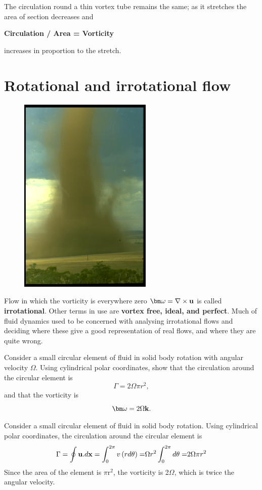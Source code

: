 \documentclass[10pt]{report}
\begin{document}
The circulation round a thin vortex tube remains the same; as it stretches
the area of section decreases and
\begin{center}
\textbf{Circulation / Area = Vorticity}
\end{center}
increases in proportion to the stretch.

\section{Rotational and irrotational flow}

\begin{figure}
\centerline{\includegraphics[width=2.5in]{Section46.pdf}}
\caption{ }
\label{fig3.6}
\end{figure}

Flow in which the vorticity is everywhere zero ${\bm\omega} =\nabla \times {{\bf
u}}$ is called \textbf{irrotational}. Other terms in use are \textbf{vortex
free, ideal, and perfect}. Much of fluid dynamics used to be concerned with
analysing irrotational flows and deciding where these give a good
representation of real flows, and where they are quite wrong.

\begin{examplebox}
Consider a small circular element of fluid in solid body rotation with angular velocity $\Omega$. Using
cylindrical polar coordinates, show that the circulation around the circular element
is
\[ \Gamma = 2\Omega \pi r^2, \]
and that the vorticity is
\[ \bm\omega = 2\Omega{\bf k}. \]

\begin{examplesolution4}
	Consider a small circular element of fluid in solid body rotation. Using
	cylindrical polar coordinates, the circulation around the circular element
	is
	\[ \Gamma =\oint {{{\bf u}}. d{{\bf x}}} =\int_0^{2\pi }
	{v\left( {rd\theta } \right)=} \Omega r^2\int_0^{2\pi } {d\theta
	=} 2\Omega \pi r^2
	\]
	Since the area of the element is $\pi $r$^{2}$, the vorticity is 2$\Omega $,
	which is twice the angular velocity.
\end{examplesolution4}
\end{examplebox}
\end{document}
